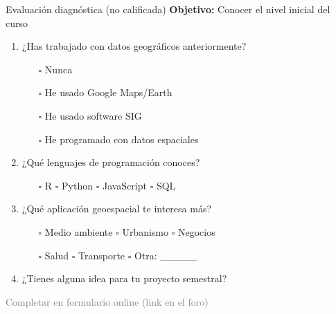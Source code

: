 \documentclass[10pt]{beamer}
\begin{document}
\begin{frame}{Evaluación diagnóstica (no calificada)}
    \textbf{Objetivo:} Conocer el nivel inicial del curso
    
    \begin{enumerate}
        \item ¿Has trabajado con datos geográficos anteriormente?
        \begin{itemize}
            \item[$\square$] Nunca
            \item[$\square$] He usado Google Maps/Earth
            \item[$\square$] He usado software SIG
            \item[$\square$] He programado con datos espaciales
        \end{itemize}
        
        \item ¿Qué lenguajes de programación conoces?
        \begin{itemize}
            \item[$\square$] R \quad $\square$ Python \quad $\square$ JavaScript \quad $\square$ SQL
        \end{itemize}
        
        \item ¿Qué aplicación geoespacial te interesa más?
        \begin{itemize}
            \item[$\square$] Medio ambiente \quad $\square$ Urbanismo \quad $\square$ Negocios
            \item[$\square$] Salud \quad $\square$ Transporte \quad $\square$ Otra: \_\_\_\_\_
        \end{itemize}
        
        \item ¿Tienes alguna idea para tu proyecto semestral?
    \end{enumerate}
    
    \begin{center}
        \textcolor{gray}{\small Completar en formulario online (link en el foro)}
    \end{center}
\end{frame}
\end{document}
